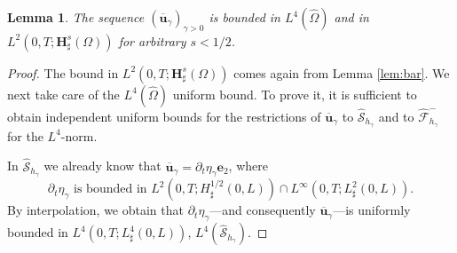 \documentclass[JEP,XML,SOM,Unicode,NoFloatCountersInSection]{cedram}
\let\mathcal\mathscr
\newtheorem{lemma}[theorem]{Lemma}
\theoremstyle{remark}
\theoremstyle{definition}
\newcommand{\ug}{\boldsymbol{u}}
\newcommand{\BS}[1]{\boldsymbol{#1}}
\let\CM\Omega
\newcommand{\CMT}{\widehat{\Omega}}
\begin{document}
\begin{lemma}
\label{lem:extension-u}
The sequence $(\overline{\ug}_{\gamma})_{\gamma >0}$ is bounded in $L^{4}(\CMT)$ and in
$L^{2}(0,T;\BS{H}^{s}_{\sharp}(\CM))$ for arbitrary $s<1/2$.
\end{lemma}
\begin{proof}The bound in $L^{2}(0,T;\BS{H}^{s}_{\sharp}(\CM))$ comes again from Lemma \ref{lem:bar}. We next take care of the $L^{4}(\CMT)$ uniform bound.
To prove it, it is sufficient to obtain independent uniform bounds for the restrictions
of $\overline{\ug}_{\gamma}$ to $\widehat{\mathcal S}_{h_{\gamma}}$ and to $\widehat{\mathcal F}^{-}_{h_{\gamma}}$ for the $L^4$-norm.

In $\widehat{\mathcal{S}}_{h_{\gamma}}$ we already know that $\overline{\ug}_{\gamma}=\partial_{t}\eta_{\gamma}\BS{e}_{2}$, where 
\[
\text{$\partial_t{\eta}_{\gamma}$ is bounded in $L^{2}(0,T;H_\sharp^{1/2}(0,L)) \cap L^{\infty}(0,T;L_\sharp^{2}(0,L))$.}
\]
By interpolation, we obtain that $\partial_{t}\eta_{\gamma}$---and consequently \resp $\overline{\ug}_{\gamma}$---is uniformly bounded in $L^{4}(0,T;L_\sharp^{4}(0,L))$, \resp $L^4(\widehat{\mathcal S}_{h_{\gamma}})$.


\end{proof}
\end{document}
